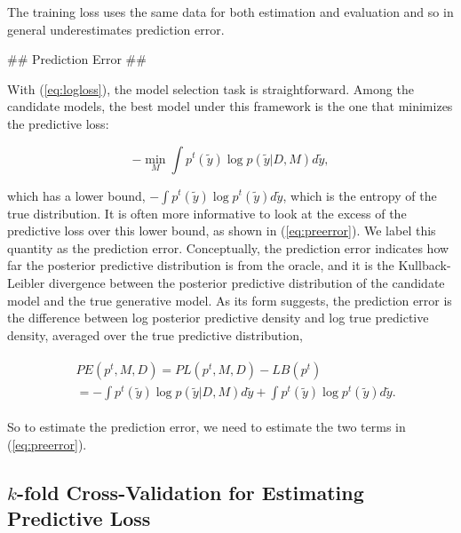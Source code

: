 \documentclass[11pt,article,oneside]{memoir}
\begin{document}
The training loss uses the same data for both estimation and evaluation and so
in general underestimates prediction error.

## Prediction Error ##

With (\ref{eq:logloss}), the model selection task is straightforward. Among the
candidate models, the best model under this framework is the one that minimizes
the predictive loss:

\begin{equation}
  \label{eq:minimizer}
  - \min_{M} \int \!p^t(\tilde y) \log p(\tilde y|D, M) d\tilde y,
  \end{equation}
  
which has a lower bound, $-\!\int\! p^t(\tilde y) \log p^t(\tilde y) d\tilde y$,
which is the entropy of the true distribution. It is often more informative to
look at the excess of the predictive loss over this lower bound, as shown in
(\ref{eq:preerror}). We label this quantity as the prediction
error. Conceptually, the prediction error indicates how far the posterior
predictive distribution is from the oracle, and it is the Kullback-Leibler
divergence between the posterior predictive distribution of the candidate model
and the true generative model. As its form suggests, the prediction error is the
difference between log posterior predictive density and log true predictive
density, averaged over the true predictive distribution,

\begin{align}
\begin{split}
  \label{eq:preerror}
    &PE(p^t, M, D)= PL(p^t, M, D) - LB(p^t) \\  
               &=-\int p^t(\tilde y) \log p(\tilde y|D, M) d\tilde y+\int
               p^t(\tilde y) \log p^t(\tilde y) d\tilde y.
               \end{split}
\end{align}

So to estimate the prediction error, we need to estimate the two terms
in (\ref{eq:preerror}).

\subsection{\texorpdfstring{\(k\)-fold Cross-Validation for Estimating
Predictive
Loss}{k-fold Cross-Validation for Estimating Predictive Loss}}\label{k-fold-cross-validation-for-estimating-predictive-loss}
\end{document}
